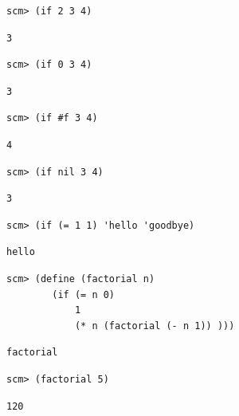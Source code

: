 \documentclass{exam}
\begin{document}
\begin{questions}
\begin{blocksection}
\begin{lstlisting}
scm> (if 2 3 4)
\end{lstlisting}
\begin{solution}[.25in]
\begin{lstlisting}
3
\end{lstlisting}
\end{solution}

\begin{lstlisting}
scm> (if 0 3 4)
\end{lstlisting}
\begin{solution}[.25in]
\begin{lstlisting}
3
\end{lstlisting}
\end{solution}

\begin{lstlisting}
scm> (if #f 3 4)
\end{lstlisting}
\begin{solution}[.25in]
\begin{lstlisting}
4
\end{lstlisting}
\end{solution}

\begin{lstlisting}
scm> (if nil 3 4)
\end{lstlisting}
\begin{solution}[.25in]
\begin{lstlisting}
3
\end{lstlisting}
\end{solution}

\begin{lstlisting}
scm> (if (= 1 1) 'hello 'goodbye)
\end{lstlisting}
\begin{solution}[.25in]
\begin{lstlisting}
hello
\end{lstlisting}
\end{solution}

\begin{lstlisting}
scm> (define (factorial n)
        (if (= n 0)
            1
            (* n (factorial (- n 1)) )))
\end{lstlisting}
\begin{solution}[.25in]
\begin{lstlisting}
factorial
\end{lstlisting}
\end{solution}

\begin{lstlisting}
scm> (factorial 5)
\end{lstlisting}
\begin{solution}[.25in]
\begin{lstlisting}
120
\end{lstlisting}
\end{solution}


\end{blocksection}
\end{questions}
\end{document}
